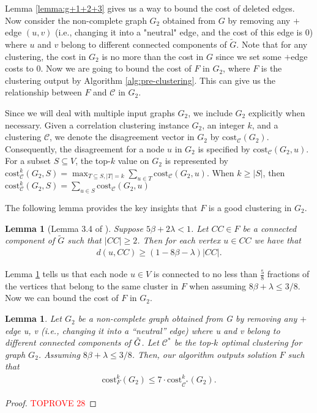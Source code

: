 \documentclass[11pt]{article}
\newcommand{\cost}{\mathrm{cost}}
\newtheorem{lemma}[theorem]{Lemma}
\newcommand{\calC}{{\mathcal{C}}}
\begin{document}
\begin{CJK*}{UTF8}{gbsn}
Lemma \ref{lemma:g+1+2+3} gives us a way to bound the cost of deleted edges. Now consider the non-complete graph $G_2$ obtained from $G$ by removing any $+$edge $(u, v)$ (i.e., changing it into a "neutral" edge, and the cost of this edge is $0$) where $u$ and $v$ belong to different connected components of $\tilde{G}$. Note that for any clustering, the cost in $G_2$ is no more than the cost in $G$ since we set some $+$edge costs to 0. Now we are going to bound the cost of $F$ in $G_2$, where $F$ is the clustering output by Algorithm \ref{alg:pre-clustering}. This can give us the relationship between $F$ and $\calC$ in $G_2$. 

Since we will deal with multiple input graphs $G_2$, we include $G_2$ explicitly when necessary. Given a correlation clustering instance $G_2$, an integer $k$, and a clustering $\mathcal{C}$, we denote the disagreement vector in $G_2$ by $\cost_\calC(G_2)$. Consequently, the disagreement for a node $u$ in $G_2$ is specified by $\cost_\calC(G_2, u)$. For a subset $S \subseteq V$, the top-$k$ value on $G_2$ is represented by $\cost^k_\calC(G_2, S) = \max_{T \subseteq S, |T| = k} \sum_{u \in T} \cost_\calC(G_2, u)$. When $k \geq |S|$, then $\cost^k_\calC(G_2, S) = \sum_{u \in S} \cost_\calC(G_2, u)$

The following lemma provides the key insights that $F$ is a good clustering in $G_2$.

\begin{lemma}[Lemma 3.4 of \cite{cohen2021correlation}]
\label{lemma:preclusteringconnecttomostnodesinsameclustering}
    Suppose $5\beta + 2\lambda < 1$. Let $CC \in F$ be a connected component of $\widetilde{G}$ such that $|CC|\ge 2$. Then for each vertex $u\in CC$ we have that 
    \begin{align*}
        d(u,CC)\ge (1-8\beta-\lambda)|CC|.
    \end{align*}
\end{lemma}

Lemma \ref{lemma:preclusteringconnecttomostnodesinsameclustering} tells us that each node $u \in V$ is connected to no less than $\frac{5}{8}$ fractions of the vertices that belong to the same cluster in $F$ when assuming $8\beta + \lambda \leq 3/8$. Now we can bound the cost of $F$ in $G_2$.

\begin{lemma}
\label{lem:nearoptimalindeletedgraph}
Let $G_2$ be a non-complete graph obtained from G by removing any $+$ edge {u, v} (i.e., changing it into a
“neutral” edge) where u and v belong to different connected components of $\Tilde{G}$. Let $\mathcal{C}^*$ be the top-$k$ optimal clustering for graph $G_2$. Assuming $8\beta + \lambda \leq 3/8$. Then, our algorithm outputs solution $F$ such that 
\begin{align*}
    \cost^k_{F}(G_2) \leq 7\cdot \cost^k_{\calC^*}(G_2).
\end{align*}
\end{lemma}
\begin{proof}\textcolor{red}{TOPROVE 28}\end{proof}


\end{CJK*}
\end{document}
